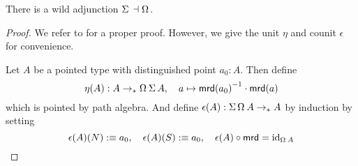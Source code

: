 \documentclass[english,a4]{article}
\def\githubpath{\tt\small}
\renewcommand{\ap}[1]{\left[{#1}\right]}
\newcommand{\ptdto}{\to_\ast}%
\begin{document}
\begin{proposition}
  There is a wild adjunction $\susp \null \leftadjto \loopspace \null$.
  \label{prop:susp-loop-adjunction}
\end{proposition}
\begin{proof}
  We refer to \cite[\githubpath
  theorems/homotopy/SuspAdjointLoop.agda]{hott-agda} for a proper proof.
  However, we give the unit $\eta$ and counit $\epsilon$ for convenience.

  Let $A$ be a pointed type with distinguished point $a_0:A$. Then define
  \begin{displaymath}
    \eta(A) : A \ptdto \loopspace\null\susp A, \quad
    a \mapsto \inv{\mrd(a_0)} \cdot \mrd(a)
  \end{displaymath}
  which is pointed by path algebra.
  And define $\epsilon(A) : \susp \loopspace \null A \ptdto A$ by induction by
  setting
  \begin{displaymath}
    \epsilon(A)(N) \defequi a_0,\quad
    \epsilon(A)(S) \defequi a_0,\quad
    \epsilon(A)\circ \mrd = \id_{\loopspace\null A}
  \end{displaymath}

\end{proof}
\end{document}
